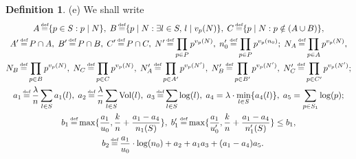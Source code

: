 \documentclass[a4paper, 12pt]{article}
\DeclareMathOperator{\defeq}{\overset{\text{\tiny{def}}}{=}}
\DeclareMathOperator{\Vol}{\text{Vol}}
\numberwithin{equation}{section}
\theoremstyle{definition}
\newtheorem{definition}[thm]{Definition}
\begin{document}
\begin{definition}
(e) We shall write
\small\begin{gather*}
A\defeq \{p\in S : p\mid N\}, \;
B\defeq \{p\mid N: \exists l\in S,\, l\mid v_p(N) \}, \;
C\defeq \{p\mid N: p \notin (A\cup B)\}, \\
%
A' \defeq P \cap A, \;
B' \defeq P \cap B, \;
C' \defeq P \cap C, \;
N'\defeq \prod_{p\in P}p^{v_p(N)}, \;
n'_0 \defeq \prod_{p\in P}p^{v_p(n_0)}; \;
N_A \defeq \prod_{p\in A}p^{v_p(N)}, \\
N_B \defeq \prod_{p\in B}p^{v_p(N)},  \;
N_C \defeq \prod_{p\in C}p^{v_p(N)}, \;
N'_A \defeq \prod_{p\in A'}p^{v_p(N')}, \; 
N'_B \defeq \prod_{p\in B'}p^{v_p(N')},  \;
N'_C \defeq \prod_{p\in C'}p^{v_p(N')}; \\
%
a_1 \defeq \frac{\lambda}{n}\sum_{l\in S}a_1(l), \;
a_2 \defeq \frac{\lambda}{n}\sum_{l\in S}\Vol(l), \;
a_3 \defeq \sum_{l\in S}\log(l), \;
a_4 =\lambda\cdot \min_{l\in S}\{ a_4(l) \}, \;
a_5 = \sum_{p\in S_1} \log(p); \\
%
b_1 \defeq \max\{\frac{a_1}{u_0}, \frac{k}{n} + \frac{a_1-a_4}{n_1(S)} \}, \;
b'_1 \defeq \max\{\frac{a_1}{u'_0}, \frac{k}{n} + \frac{a_1-a_4}{n'_1(S)} \} \le b_1, \\
\quad  b_2 \defeq \frac{a_1}{u_0}\cdot \log(n_0) + a_2 + a_1a_3 + (a_1-a_4)a_5 .
\end{gather*}\normalsize

\end{definition}
 
 
\end{document}
